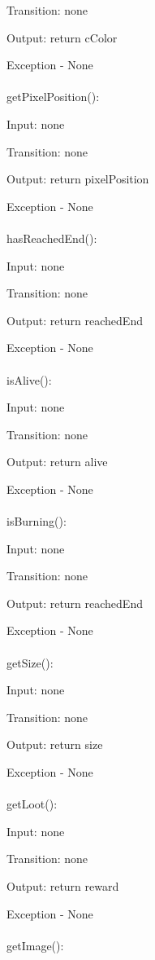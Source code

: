 \documentclass[12,english]{article}
\begin{document}
		    Transition: none
		    
		    Output: return cColor
		     
		    Exception - None\\  
		    \\
		getPixelPosition():
		
		    Input: none
		     
		    Transition: none
		    
		    Output: return pixelPosition
		     
		    Exception - None\\  
		    \\
		hasReachedEnd():
		
		    Input: none
		     
		    Transition: none
		    
		    Output: return reachedEnd
		     
		    Exception - None\\  
		    \\
        isAlive():
		
		    Input: none
		     
		    Transition: none
		    
		    Output: return alive
		     
		    Exception - None\\  
		    \\
        isBurning():
		
		    Input: none
		     
		    Transition: none
		    
		    Output: return reachedEnd
		     
		    Exception - None\\  
		    \\
        getSize():
		
		    Input: none
		     
		    Transition: none
		    
		    Output: return size
		     
		    Exception - None\\  
		    \\
		getLoot():
		
		    Input: none
		     
		    Transition: none
		    
		    Output: return reward
		     
		    Exception - None\\  
		    \\
		getImage():
		
\end{document}
